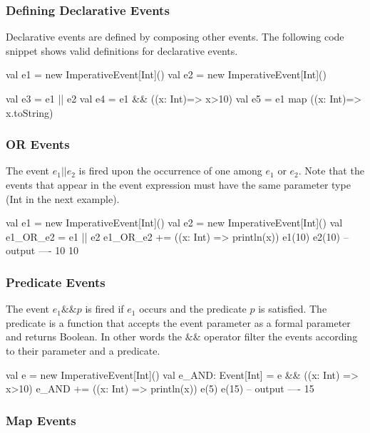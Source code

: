 \documentclass[10pt,a4paper]{article}
\newcommand{\code}[1]{{\fontfamily{cmtt}\small\selectfont#1}}
\begin{document}
\subsubsection{Defining Declarative Events}

Declarative events are defined by composing other events. The
following code snippet shows valid definitions for declarative events.

\begin{codenv}
val e1 = new ImperativeEvent[Int]()
val e2 = new ImperativeEvent[Int]()

val e3 = e1 || e2
val e4 = e1 && ((x: Int)=> x>10)
val e5 = e1 map ((x: Int)=> x.toString)
\end{codenv}


\subsubsection{OR Events}

The event $e_1 || e_2$ is fired upon the occurrence of one among $e_1$
or $e_2$. Note that the events that appear in the event expression
must have the same parameter type (\code{Int} in the next example).

\begin{codenv}
val e1 = new ImperativeEvent[Int]()
val e2 = new ImperativeEvent[Int]()
val e1_OR_e2 = e1 || e2
e1_OR_e2 += ((x: Int) => println(x))
e1(10)
e2(10)
-- output ----
10
10
\end{codenv}


\subsubsection{Predicate Events}

The event $e_1 \&\& p$ is fired if $e_1$ occurs and the predicate $p$
is satisfied. The predicate is a function that accepts the event
parameter as a formal parameter and returns \code{Boolean}. In other
words the $\&\&$ operator filter the events according to their
parameter and a predicate.

\begin{codenv}
val e = new ImperativeEvent[Int]()
val e_AND: Event[Int] = e && ((x: Int) => x>10)
e_AND += ((x: Int) => println(x))
e(5)
e(15)
-- output ----
15
\end{codenv}


\subsubsection{Map Events}
\end{document}

